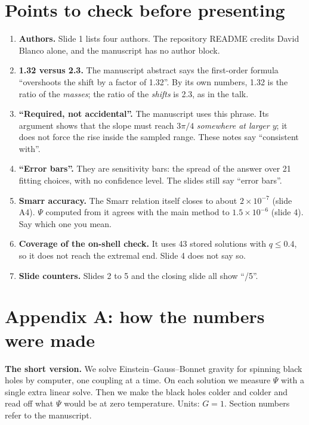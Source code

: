 \documentclass[12pt,a4paper]{article}
\begin{document}
\section*{Points to check before presenting}

\begin{enumerate}[nosep]
\item \textbf{Authors.} Slide 1 lists four authors. The repository README credits
David Blanco alone, and the manuscript has no author block.
\item \textbf{1.32 versus 2.3.} The manuscript abstract says the first-order formula
``overshoots the shift by a factor of 1.32''. By its own numbers, 1.32 is the ratio
of the \emph{masses}; the ratio of the \emph{shifts} is 2.3, as in the talk.
\item \textbf{``Required, not accidental''.} The manuscript uses this phrase. Its
argument shows that the slope must reach $3\pi/4$ \emph{somewhere at larger $y$}; it
does not force the rise inside the sampled range. These notes say ``consistent with''.
\item \textbf{``Error bars''.} They are sensitivity bars: the spread of the answer over
21 fitting choices, with no confidence level. The slides still say ``error bars''.
\item \textbf{Smarr accuracy.} The Smarr relation itself closes to about
$2\times10^{-7}$ (slide A4). $\Psi$ computed from it agrees with the main method to
$1.5\times10^{-6}$ (slide 4). Say which one you mean.
\item \textbf{Coverage of the on-shell check.} It uses 43 stored solutions with
$q\le0.4$, so it does not reach the extremal end. Slide 4 does not say so.
\item \textbf{Slide counters.} Slides 2 to 5 and the closing slide all show ``/5''.
\end{enumerate}

\newpage
\section*{Appendix A: how the numbers were made}

\textbf{The short version.} We solve Einstein--Gauss--Bonnet gravity for spinning
black holes by computer, one coupling at a time. On each solution we measure
$\Psi$ with a single extra linear solve. Then we make the black holes colder and
colder and read off what $\Psi$ would be at zero temperature. Units: $G=1$. Section
numbers refer to the manuscript.
\end{document}
